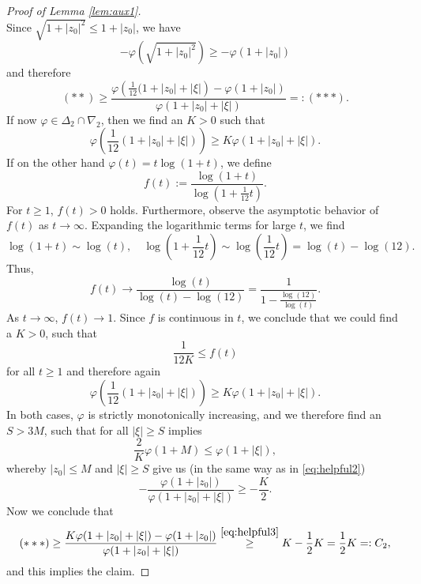 \documentclass[10pt,a4paper]{amsart}
\begin{document}
\begin{proof}[Proof of Lemma \ref{lem:aux1}]
\[		\]
		Since $\sqrt{1+|z_0|^2} \leq 1+|z_0|$, we have \[
		-\varphi \left(\sqrt{1+|z_0|^2} \right)  \geq -\varphi(1+|z_0|)
		\]
		and therefore \[
		(**) \geq \frac{\varphi \left(\frac{1}{12}(1+|z_0|+|\xi| \right) - \varphi(1+|z_0|)}{\varphi(1+|z_0|+|\xi|)} =: (***).
		\]
		If now $\varphi \in \Delta_2 \cap \nabla_2$, then we find an $K>0$ such that \[
		\varphi \left(\frac{1}{12}(1+|z_0|+|\xi|)\right) \geq K\varphi(1+|z_0|+|\xi|).
		\] 
		If on the other hand $\varphi(t) = t \log(1+t)$, we define \[
		f(t) := \frac{\log(1+t)}{\log(1+\frac{1}{12}t)}. 
		\]
		For $t \geq 1$, $f(t) > 0$ holds. Furthermore, observe the asymptotic behavior of $f(t)$ as $t \to \infty$. Expanding the logarithmic terms for large $t$, we find
		\[
		\log(1+t) \sim \log(t), \quad \log\left(1 + \frac{1}{12}t\right) \sim \log\left(\frac{1}{12}t\right) = \log(t) - \log(12).
		\]
		Thus, 
		\[
		f(t) \to \frac{\log(t)}{\log(t) - \log(12)} = \frac{1}{1 - \frac{\log(12)}{\log(t)}}.
		\]
		As $t \to \infty$, $f(t) \to 1$. Since $f$ is continuous in $t$, we conclude that we could find a $K>0$, such that \[
		\frac{1}{12K} \leq f(t)
		\]
		for all $t \geq 1$ and therefore again \[
		\varphi \left(\frac{1}{12}(1+|z_0|+|\xi|) \right) \geq K\varphi(1+|z_0|+|\xi|).
		\]
		In both cases, $\varphi$ is strictly monotonically increasing, and we therefore find an $S>3M$, such that for all $|\xi| \geq S$ implies \[
		\frac{2}{K} \varphi(1+M) \leq \varphi(1+|\xi|),
		\]
		whereby $|z_0| \leq M$ and $|\xi| \geq S$ give us (in the same way as in \eqref{eq:helpful2}) \begin{equation} \label{eq:helpful3}
			-\frac{\varphi(1+|z_{0}|)}{\varphi(1+|z_{0}|+|\xi|)}\geq -\frac{K}{2}. 
		\end{equation}
		Now we conclude that \[
		(***) \geq \frac{K\varphi(1+|z_0|+|\xi|) - \varphi(1+|z_0|)}{\varphi(1+|z_0|+|\xi|)} \overset{\eqref{eq:helpful3}}{\geq} K - \frac{1}{2}K = \frac{1}{2} K =: C_2, 
		\]
		and this implies the claim. 
	\end{proof}
\end{document}
